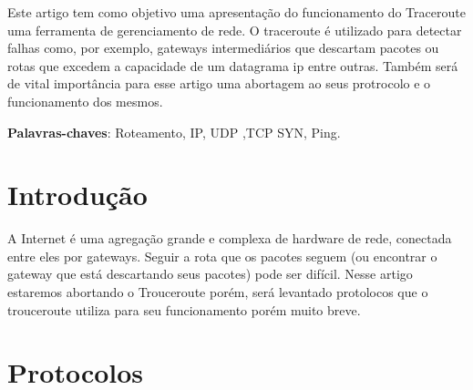 \documentclass[
	article,			%
	11pt,				%
	oneside,			%
	a4paper,			%
	english,			%
	brazil,				%
	sumario=tradicional
	]{abntex2}
\begin{document}
\frenchspacing 


%
%
\maketitle

\begin{resumoumacoluna}
 Este artigo tem como objetivo uma apresentação do funcionamento do Traceroute uma ferramenta de gerenciamento de rede. O traceroute é utilizado para detectar falhas como, por exemplo, gateways intermediários que descartam pacotes ou rotas que excedem a capacidade de um datagrama ip entre outras. Também será de vital importância para esse artigo uma abortagem ao seus protrocolo e o funcionamento dos mesmos.
 
 
 \vspace{\onelineskip}
 
 \noindent
 \textbf{Palavras-chaves}: Roteamento, IP, UDP ,TCP SYN, Ping.
\end{resumoumacoluna}


\textual

\section*{Introdução}
A Internet é uma agregação grande e complexa de hardware de rede, conectada entre eles por gateways. Seguir a rota que os pacotes seguem (ou encontrar o gateway que está descartando seus pacotes) pode ser difícil. 
Nesse artigo estaremos abortando o Trouceroute porém, será levantado protolocos que o trouceroute utiliza para seu funcionamento porém muito breve.

\section{Protocolos}
\end{document}
